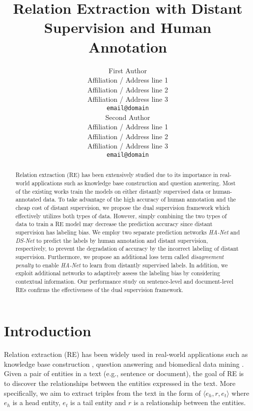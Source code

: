 \documentclass[11pt]{article}
\title{Relation Extraction with Distant Supervision and Human Annotation}
\author{First Author \\
  Affiliation / Address line 1 \\
  Affiliation / Address line 2 \\
  Affiliation / Address line 3 \\
  {\tt email@domain} \\\And
  Second Author \\
  Affiliation / Address line 1 \\
  Affiliation / Address line 2 \\
  Affiliation / Address line 3 \\
  {\tt email@domain} \\}
\date{}
\newcommand{\triple}[3]{\ensuremath{\langle #1,#2,#3\rangle}}
\newcommand{\hanet}{\emph{HA-Net}\xspace}
\newcommand{\dsnet}{\emph{DS-Net}\xspace}
\newcommand{\head}{$e_{h}$\xspace}
\newcommand{\tail}{$e_{t}$\xspace}
\newcommand{\ehead}{e_{h}}
\newcommand{\etail}{e_{t}}
\begin{document}
\maketitle
\begin{abstract}





Relation extraction (RE) has been extensively studied due to its importance in real-world applications such as knowledge base construction and question answering.
Most of the existing works train the models on either distantly supervised data or human-annotated data.
To take advantage of the high accuracy of human annotation and the cheap cost of distant supervision, we propose the dual supervision framework which effectively utilizes both types of data.
However, simply combining the two types of data to train a RE model may decrease the prediction accuracy since distant supervision has labeling bias.
We employ two separate prediction networks \hanet and \dsnet to predict the labels by human annotation and distant supervision, respectively, to prevent the degradation of accuracy by the incorrect labeling of distant supervision.
Furthermore, we propose an additional loss term called \emph{disagreement penalty}
to enable \hanet to learn from distantly supervised labels.
In addition, we exploit additional networks to adaptively assess the labeling bias by considering contextual information.
Our performance study on sentence-level and document-level REs confirms the effectiveness of the dual supervision framework.







\end{abstract} 

\section{Introduction}
\label{sec:intro}
Relation extraction (RE) has been widely used in real-world applications such as knowledge base construction \cite{dong2014knowledge,KnowledgeFusion,JungKS19}, question answering \cite{xu2016question} and biomedical data mining \cite{ahmed2019bio}.
Given a pair of entities in a text (e.g., sentence or document), the goal of RE is to discover the relationships between the entities expressed in the text.
More specifically, we aim to extract triples from the text in the form of \triple{\ehead}{r}{\etail} where \head is a head entity, \tail is a tail entity and $r$ is a relationship between the entities.
\end{document}
